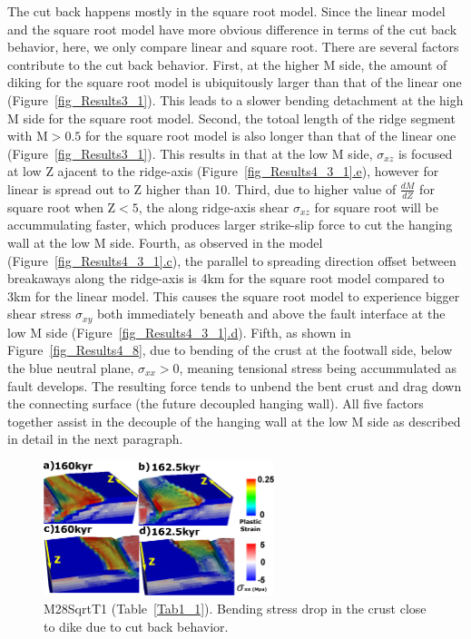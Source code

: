 The cut back happens mostly in the square root model. Since the linear model and the square root model have more obvious difference in terms of the cut back behavior, here, we only compare linear and square root. There are several factors contribute to the cut back behavior. First, at the higher M side, the amount of diking for the square root model is ubiquitously larger than that of the linear one (Figure~\hyperref[fig_Results3_1]{\ref{fig_Results3_1}}). This leads to a slower bending detachment at the high M side for the square root model. Second, the totoal length of the ridge segment with M$>0.5$ for the square root model is also longer than that of the linear one (Figure~\hyperref[fig_Results3_1]{\ref{fig_Results3_1}}). This results in that at the low M side, $\sigma_{xz}$ is focused at low Z ajacent to the ridge-axis (Figure~\hyperref[fig_Results4_3_1]{\ref{fig_Results4_3_1}.e}), however for linear is spread out to Z higher than 10. Third, due to higher value of $\frac{dM}{dZ}$ for square root when Z$<5$, the along ridge-axis shear $\sigma_{xz}$ for square root will be accummulating faster, which produces larger strike-slip force to cut the hanging wall at the low M side. Fourth, as observed in the model (Figure~\hyperref[fig_Results4_3_1]{\ref{fig_Results4_3_1}.c}), the parallel to spreading direction offset between breakaways along the ridge-axis is 4km for the square root model compared to 3km for the linear model. This causes the square root model to experience bigger shear stress $\sigma_{xy}$ both immediately beneath and above the fault interface at the low M side (Figure~\hyperref[fig_Results4_3_1]{\ref{fig_Results4_3_1}.d}). Fifth, as shown in Figure~\hyperref[fig_Results4_8]{\ref{fig_Results4_8}}, due to bending of the crust at the footwall side, below the blue neutral plane, $\sigma_{xx}>0$, meaning tensional stress being accummulated as fault develops. The resulting force tends to unbend the bent crust and drag down the connecting surface (the future decoupled hanging wall). All five factors together assist in the decouple of the hanging wall at the low M side as described in detail in the next paragraph.

\begin{figure}[h]
  \centering
    \includegraphics[width=0.6\textwidth]{./Figures/fig_Results4_6_sqrt_cut_back_bending_drop.eps}
  \caption{M28SqrtT1 (Table~\hyperref[Tab1_1]{\ref{Tab1_1}}). Bending stress drop in the crust close to dike due to cut back behavior.}
 \label{fig_Results4_6}
\end{figure}


